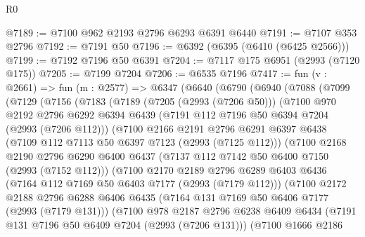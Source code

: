 \begin{lexlean}{R0}
\begin{coremodule}
@7189 := @7100 @962 @2193 @2796 @6293 @6391 @6440
@7191 := @7107 @353 @2796
@7192 := @7191 @50
@7196 := @6392 (@6395 (@6410 (@6425 @2566)))
@7199 := @7192 @7196 @50 @6391
@7204 := @7117 @175 @6951 (@2993 (@7120 @175))
@7205 := @7199 @7204
@7206 := @6535 @7196
@7417 := fun (v : @2661) =>
  fun (m : @2577) =>
  @6347
    (@6640
      (@6790
        (@6940
          (@7088
            (@7099
              (@7129
                (@7156
                  (@7183
                    (@7189
                      (@7205 (@2993 (@7206 @50)))
                      (@7100
                        @970
                        @2192
                        @2796
                        @6292
                        @6394
                        @6439
                        (@7191 @112 @7196 @50 @6394 @7204 (@2993 (@7206 @112)))
                        (@7100
                          @2166
                          @2191
                          @2796
                          @6291
                          @6397
                          @6438
                          (@7109 @112 @7113 @50 @6397 @7123 (@2993 (@7125 @112)))
                          (@7100
                            @2168
                            @2190
                            @2796
                            @6290
                            @6400
                            @6437
                            (@7137 @112 @7142 @50 @6400 @7150 (@2993 (@7152 @112)))
                            (@7100
                              @2170
                              @2189
                              @2796
                              @6289
                              @6403
                              @6436
                              (@7164 @112 @7169 @50 @6403 @7177 (@2993 (@7179 @112)))
                              (@7100
                                @2172
                                @2188
                                @2796
                                @6288
                                @6406
                                @6435
                                (@7164 @131 @7169 @50 @6406 @7177 (@2993 (@7179 @131)))
                                (@7100
                                  @978
                                  @2187
                                  @2796
                                  @6238
                                  @6409
                                  @6434
                                  (@7191 @131 @7196 @50 @6409 @7204 (@2993 (@7206 @131)))
                                  (@7100
                                    @1666
                                    @2186

\end{coremodule}
\end{lexlean}
